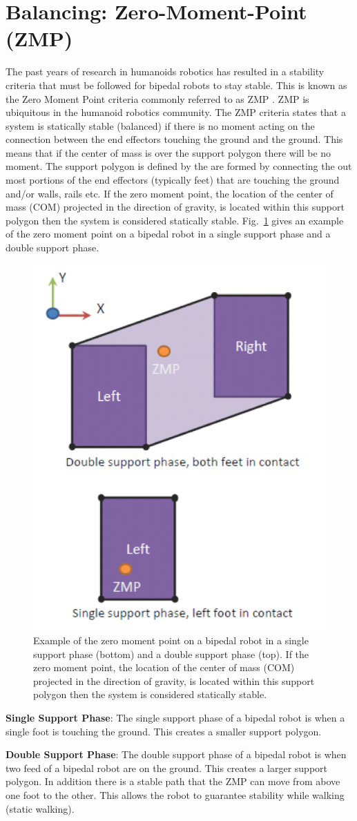 \section{Balancing: Zero-Moment-Point (ZMP)}\label{sec:zmp}
The past years of research in humanoids robotics has resulted in a stability criteria that must be followed for bipedal robots to stay stable.
This is known as the Zero Moment Point criteria commonly referred to as ZMP \cite{zmp35}.
ZMP is ubiquitous in the humanoid robotics community.
The ZMP criteria states that a system is statically stable (balanced) if there is no moment acting on the connection between the end effectors touching the ground and the ground.
This means that if the center of mass is over the support polygon there will be no moment.
The support polygon is defined by the are formed by connecting the out most portions of the end effectors (typically feet) that are touching the ground and/or walls, rails etc. 
If the zero moment point, the location of the center of mass (COM) projected in the direction of gravity, is located within this support polygon then the system is considered statically stable.
Fig.~\ref{fig:zmp} gives an example of the zero moment point on a bipedal robot in a single support phase and a double support phase.


\begin{figure}[thpb]
  \centering
\includegraphics[width=0.5\columnwidth]{./background/pix/zmp.png}
  \caption{Example of the zero moment point on a bipedal robot in a single support phase (bottom) and a double support phase (top).  
If the zero moment point, the location of the center of mass (COM) projected in the direction of gravity, is located within this support polygon then the system is considered statically stable.}
  \label{fig:zmp}
\end{figure}

\noindent \textbf{Single Support Phase}:
The single support phase of a bipedal robot is when a single foot is touching the ground.
This creates a smaller support polygon.

\noindent \textbf{Double Support Phase}:
The double support phase of a bipedal robot is when two feed of a bipedal robot are on the ground.
This creates a larger support polygon.  
In addition there is a stable path that the ZMP can move from above one foot to the other.
This allows the robot to guarantee stability while walking (static walking).

